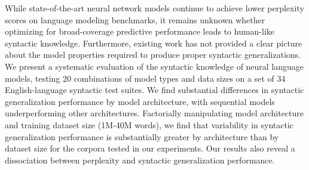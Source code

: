 While state-of-the-art neural network models continue to achieve lower perplexity scores on language modeling benchmarks, it remains unknown whether optimizing for broad-coverage predictive performance leads to human-like syntactic knowledge. Furthermore, existing work has not provided a clear picture about the model properties required to produce proper syntactic generalizations. We present a systematic evaluation of the syntactic knowledge of neural language models, testing 20 combinations of model types and data sizes on a set of 34 English-language syntactic test suites.  We find substantial differences in syntactic generalization performance by model architecture, with sequential models underperforming other architectures. Factorially manipulating model architecture and training dataset size (1M-40M words), we find that variability in syntactic generalization performance is substantially greater by architecture than by dataset size for the corpora tested in our experiments. Our results also reveal a dissociation between perplexity and syntactic generalization performance.
